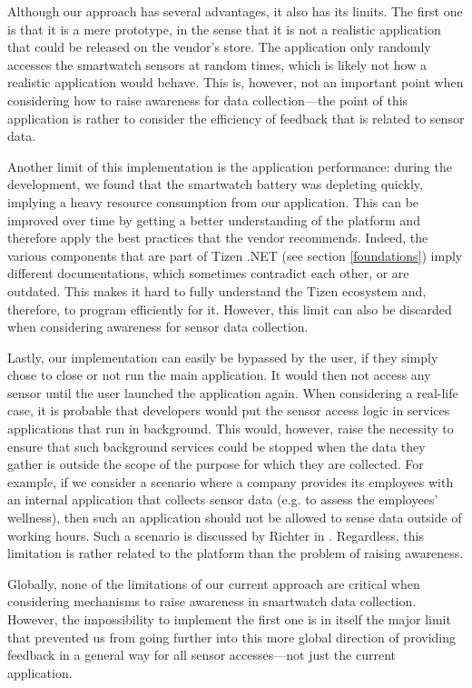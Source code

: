 \documentclass[conference, a4paper, 10pt, twocolumn]{IEEEtran}
\begin{document}
Although our approach has several advantages, it also has its limits. The first one is that it is a mere prototype, in the sense that it is not a realistic application that could be released on the vendor's store. The application only randomly accesses the smartwatch sensors at random times, which is likely not how a realistic application would behave. This is, however, not an important point when considering how to raise awareness for data collection---the point of this application is rather to consider the efficiency of feedback that is related to sensor data.  

Another limit of this implementation is the application performance: during the development, we found that the smartwatch battery was depleting quickly, implying a heavy resource consumption from our application. This can be improved over time by getting a better understanding of the platform and therefore apply the best practices that the vendor recommends. Indeed, the various components that are part of Tizen .NET (see section \ref{foundations}) imply different documentations, which sometimes contradict each other, or are outdated. This makes it hard to fully understand the Tizen ecosystem and, therefore, to program efficiently for it. However, this limit can also be discarded when considering awareness for sensor data collection.

Lastly, our implementation can easily be bypassed by the user, if they simply chose to close or not run the main application. It would then not access any sensor until the user launched the application again. When considering a real-life case, it is probable that developers would put the sensor access logic in services applications that run in background. This would, however, raise the necessity to ensure that such background services could be stopped when the data they gather is outside the scope of the purpose for which they are collected. For example, if we consider a scenario where a company provides its employees with an internal application that collects sensor data (e.g. to assess the employees' wellness), then such an application should not be allowed to sense data outside of working hours. Such a scenario is discussed by Richter in \cite{richter2020privacy}. Regardless, this limitation is rather related to the platform than the problem of raising awareness. 

Globally, none of the limitations of our current approach are critical when considering mechanisms to raise awareness in smartwatch data collection. However, the impossibility to implement the first one is in itself the major limit that prevented us from going further into this more global direction of providing feedback in a general way for all sensor accesses---not just the current application.
\end{document}
